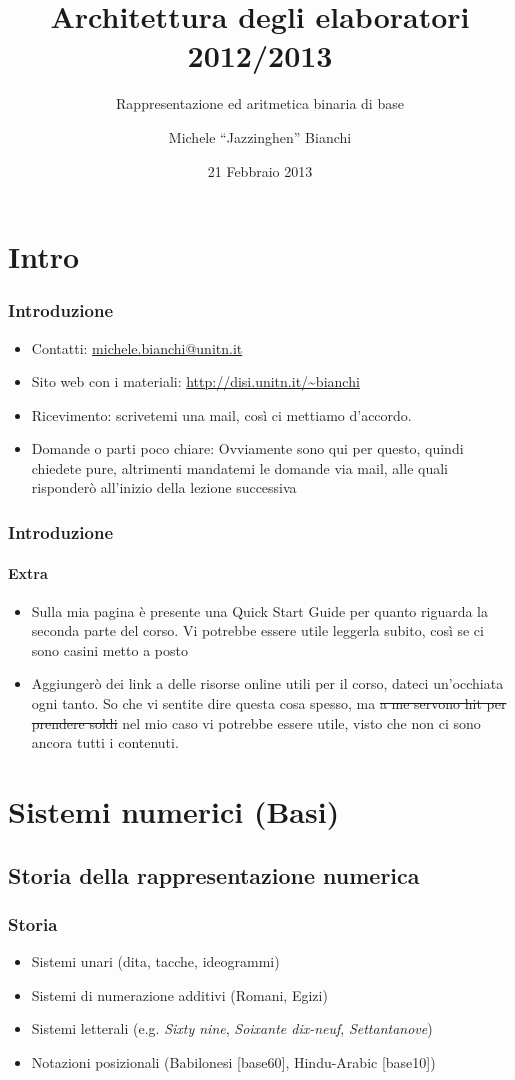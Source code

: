 \documentclass{beamer}
\title[Arch2013] %
{Architettura degli elaboratori 2012/2013}
\subtitle{Rappresentazione ed aritmetica binaria di base}
\author{Michele ``Jazzinghen'' Bianchi\inst{1}}
\institute[DISI] %
{
  \inst{1}%
  Dipartimento di Ingegneria e Scienze dell'Informazione\\
  Universtià degli Studi di Trento
}
\date[FEB 2013] %
{21 Febbraio 2013}
\begin{document}
	\frame{\titlepage}
	\section{Intro}
	\begin{frame}
    \frametitle{Introduzione}
		\begin{itemize}
			\item Contatti: \url{michele.bianchi@unitn.it}
		  \item Sito web con i materiali: \url{http://disi.unitn.it/~bianchi}
		  \item Ricevimento: scrivetemi una mail, così ci mettiamo d'accordo.
		  \item Domande o parti poco chiare: Ovviamente sono qui per questo, quindi
		    chiedete pure, altrimenti mandatemi le domande via mail, alle quali
		    risponderò all'inizio della lezione successiva
		\end{itemize}    
   
  \end{frame}
  \begin{frame}
    \frametitle{Introduzione}
    \framesubtitle{Extra}
    \begin{itemize}
    		\item Sulla mia pagina è presente una Quick Start Guide per quanto riguarda
    			la seconda parte del corso. Vi potrebbe essere utile leggerla subito, così
    			se ci sono casini metto a posto
    		\item Aggiungerò dei link a delle risorse online utili per il corso, dateci
    			un'occhiata ogni tanto. So che vi sentite dire questa cosa spesso, ma \st{a me%
    			servono hit per prendere soldi} nel mio caso vi potrebbe essere utile, visto
    			che non ci sono ancora tutti i contenuti.
    \end{itemize}
  \end{frame}

  \section[AllYourBases...]{Sistemi numerici (Basi)}
	\subsection{Storia della rappresentazione numerica}  
  \begin{frame}
    \frametitle{Storia}
    \begin{itemize}
    		\item Sistemi unari (dita, tacche, ideogrammi)
    		\item Sistemi di numerazione additivi (Romani, Egizi)
    		\item Sistemi letterali (e.g. \emph{Sixty nine}, \emph{Soixante dix-neuf}, \emph{Settantanove})
    		\item Notazioni posizionali (Babilonesi [base60], Hindu-Arabic [base10])
    \end{itemize}
  \end{frame}
	
\end{document}
